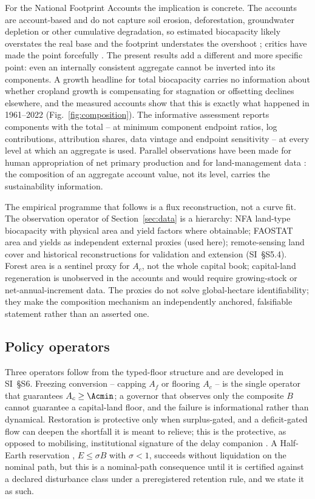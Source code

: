 For the National Footprint Accounts the implication is concrete. The accounts are account-based and do not capture soil erosion, deforestation, groundwater depletion or other cumulative degradation, so estimated biocapacity likely overstates the real base and the footprint understates the overshoot \citep{Wackernagel2002,Borucke2013}; critics have made the point forcefully \citep{Blomqvist2013,GiampietroSaltelli2014,Galli2016,vdBerghGrazi2015}. The present results add a different and more specific point: even an internally consistent aggregate cannot be inverted into its components. A growth headline for total biocapacity carries no information about whether cropland growth is compensating for stagnation or offsetting declines elsewhere, and the measured accounts show that this is exactly what happened in 1961--2022 (Fig.~\ref{fig:composition}). The informative assessment reports components with the total -- at minimum component endpoint ratios, log contributions, attribution shares, data vintage and endpoint sensitivity -- at every level at which an aggregate is used. Parallel observations have been made for human appropriation of net primary production and for land-management data \citep{Haberl2007,Krausmann2013,Erb2017,Carvalhais2014}: the composition of an aggregate account value, not its level, carries the sustainability information.

The empirical programme that follows is a flux reconstruction, not a curve fit. The observation operator of Section~\ref{sec:data} is a hierarchy: NFA land-type biocapacity with physical area and yield factors where obtainable; FAOSTAT area and yields as independent external proxies (used here); remote-sensing land cover and historical reconstructions for validation and extension (SI~\S S5.4). Forest area is a sentinel proxy for $A_c$, not the whole capital book; capital-land regeneration is unobserved in the accounts and would require growing-stock or net-annual-increment data. The proxies do not solve global-hectare identifiability; they make the composition mechanism an independently anchored, falsifiable statement rather than an asserted one.

\subsection{Policy operators}

Three operators follow from the typed-floor structure and are developed in SI~\S S6. Freezing conversion -- capping $A_f$ or flooring $A_c$ -- is the single operator that guarantees $A_c\ge\Acmin$; a governor that observes only the composite $B$ cannot guarantee a capital-land floor, and the failure is informational rather than dynamical. Restoration is protective only when surplus-gated, and a deficit-gated flow can deepen the shortfall it is meant to relieve; this is the protective, as opposed to mobilising, institutional signature of the delay companion \citep{Abaee2026a}. A Half-Earth reservation \citep{Wilson2016}, $E\le\sigma B$ with $\sigma<1$, succeeds without liquidation on the nominal path, but this is a nominal-path consequence until it is certified against a declared disturbance class under a preregistered retention rule, and we state it as such.

